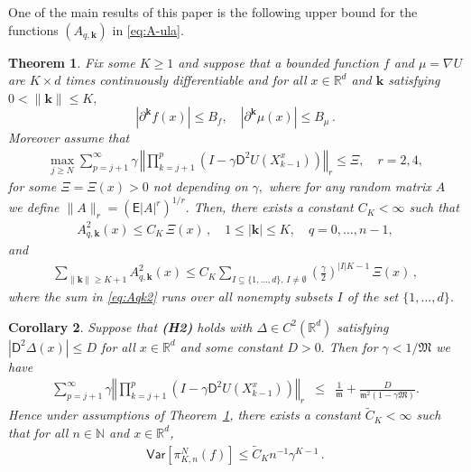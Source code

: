 \documentclass[bj]{imsart}
\def\PVar{\mathsf{Var}}
\def\nset{\mathbb{N}}
\def\rset{\mathbb{R}}
\def\rset{\mathbb{R}}
\newtheorem{thm}{Theorem}
\newtheorem{cor}[thm]{Corollary}
\def\eqsp{\,}
\begin{document}
One of the main results of this paper is the following  upper bound for the functions $(A_{q,\mathbf{k}})$ in \eqref{eq:A-ula}.
\begin{thm}\label{th:mr}
Fix some $K\geq 1$ and suppose  that a bounded function $f$ and $\mu=\nabla U$ are $K \times d $ times continuously differentiable
and for all $x\in\mathbb R^d$ and  \(\mathbf{k}\) satisfying \(0<\|\mathbf{k}\|\leq  K,\)
\begin{equation}
\label{eq:smooth-mu}
|\partial^{\mathbf{k}} f(x)|\le  B_f, \quad |\partial^{\mathbf{k}} \mu (x)|\leq B_\mu \eqsp.
\end{equation}
Moreover assume that 
\begin{eqnarray}
\label{eq:main-ass-prod}
\max_{j\geq N}\sum_{p=j+1}^{\infty}\gamma\,\left\Vert\prod_{k=j+1}^{p} (I-\gamma\mathsf{D}^{2}U(X^x_{k-1}))\right \Vert_{r}\leq \Xi,\quad r=2,4,
\end{eqnarray}
for some $\Xi=\Xi(x)>0$ not depending on $\gamma,$ where for any random matrix $A$ we define $\|A\|_r=(\mathsf{E}|A|^r)^{1/r}.$ 
Then, there exists a constant $C_K < \infty$  such that
\begin{eqnarray}
\label{eq:Aqk2}
A^2_{q,\mathbf{k}}(x)\leq C_K \,\Xi(x) \,,\quad 1\leq |\mathbf{k}|\leq K, \quad q=0,\ldots,n-1,
\end{eqnarray}
and
\begin{eqnarray}
\label{eq:Aqk2sum}
\sum_{\|\mathbf{k}\|\geq K+1} A^2_{q,\mathbf{k}}(x)\leq C_{K} \sum_{I\subseteq\{1,\ldots,d\},\, I\neq \emptyset}
\left(\frac{\gamma}{2}\right)^{|I|K-1} \, \Xi(x) \eqsp,
\end{eqnarray}
where the sum in \eqref{eq:Aqk2} runs over all nonempty subsets $I$ of the set $\{1,\ldots,d\}$.
\end{thm}
\begin{cor}
Suppose that  {\bf (H2)} holds with  $\Delta \in C^2(\mathbb{R}^d)$ satisfying $|\mathsf{D}^{2}\Delta(x)|\leq D$ for all $x\in \mathbb{R}^d$ and some constant $D>0.$ Then for  $\gamma  <1/\mathfrak{M}$ we have
 \begin{eqnarray*}
\sum_{p=j+1}^{\infty}\gamma\left\Vert\prod_{k=j+1}^{p} (I-\gamma\mathsf{D}^{2}U(X^x_{k-1}))\right\Vert _{r}&\leq &  \frac{1}{\mathfrak{m}}+\frac{ D}{\mathfrak{m}^2(1-\gamma \mathfrak{M})}.
\end{eqnarray*}
Hence under assumptions of Theorem~\ref{th:mr}, there exists  a constant $\widetilde{C}_K < \infty$  such that for all $n \in \nset$ and $x \in \rset^d$,
\begin{eqnarray}
\label{eq:var-bound}
\PVar\left[\pi_{K,n}^{N}(f)\right] \leq \widetilde{C}_K  n^{-1} \gamma^{K-1}  \eqsp.
\end{eqnarray}
\end{cor}
\end{document}
